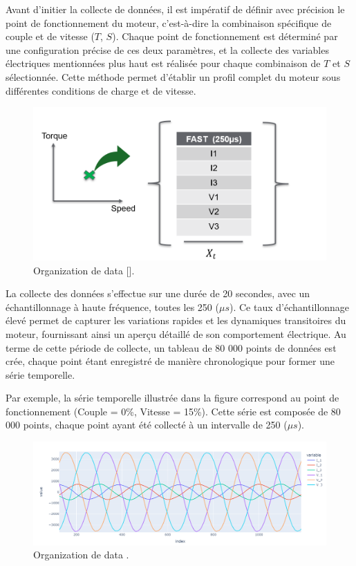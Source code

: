 Avant d'initier la collecte de données, il est impératif de définir avec
précision le point de fonctionnement du moteur, c'est-à-dire la combinaison
spécifique de couple et de vitesse (\(T\), \(S\)). Chaque point de
fonctionnement est déterminé par une configuration précise de ces deux
paramètres, et la collecte des variables électriques mentionnées plus haut est
réalisée pour chaque combinaison de \(T\) et \(S\) sélectionnée. Cette méthode
permet d'établir un profil complet du moteur sous différentes conditions de
charge et de vitesse.

\begin{figure}[hbt!]
  \centering
  \includegraphics[width=13cm]{images_pfe/speed_couple.png}
  \caption{Organization de data [\cite{yoon2019time}].}
  \label{fig:speed_couple}
\end{figure}
\FloatBarrier

La collecte des données s'effectue sur une durée de 20 secondes, avec un
échantillonnage à haute fréquence, toutes les 250 (\(\mu s\)). Ce taux
d'échantillonnage élevé permet de capturer les variations rapides et les
dynamiques transitoires du moteur, fournissant ainsi un aperçu détaillé de son
comportement électrique. Au terme de cette période de collecte, un tableau de
80 000 points de données est crée, chaque point étant enregistré de manière
chronologique pour former une série temporelle.

Par exemple, la série temporelle illustrée dans la figure correspond au point
de fonctionnement (Couple = 0\%, Vitesse = 15\%). Cette série est composée de
80 000 points, chaque point ayant été collecté à un intervalle de 250 (\(\mu
s\)).

\begin{figure}[hbt!]
  \centering
  \includegraphics[width=14cm]{images_pfe/V_I_data.png}
  \caption{Organization de data .}
  \label{fig:data_v_i}
\end{figure}
\FloatBarrier

